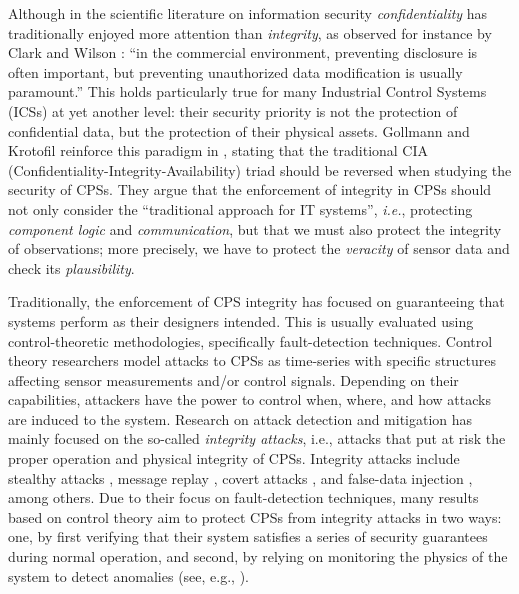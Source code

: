 {\color{red}
Although in the scientific literature on information security \emph{confidentiality} has traditionally enjoyed more attention than \emph{integrity}, as observed for instance by Clark and Wilson \cite{ClarkWilson87}: ``in the commercial environment, preventing disclosure is often important, but preventing unauthorized data modification is usually paramount.''
This holds particularly true for many Industrial Control Systems (ICSs) at yet another level: their security priority is not the protection of confidential data, but the protection of their physical assets.  Gollmann and Krotofil reinforce this paradigm in \cite{CPSSec}, stating that the traditional CIA (Confidentiality-Integrity-Availability) triad should be reversed when studying the security of CPSs. They argue that the enforcement of integrity in CPSs should not only consider the ``traditional approach for IT systems'', \emph{i.e.}, protecting \emph{component logic} and \emph{communication}, but that we must also protect the integrity of {observations}; more precisely, we have to protect the \emph{veracity} of sensor data and check its \emph{plausibility}.}

{Traditionally, the enforcement of CPS integrity has focused on guaranteeing that systems perform as their designers intended. This is usually evaluated using {control-theoretic methodologies}, specifically {fault-detection techniques}. Control theory researchers model attacks to CPSs as time-series with specific structures affecting sensor measurements and/or control signals. Depending on their capabilities, attackers have the power to control when, where, and how attacks are induced to the system. Research on attack detection and mitigation has mainly focused on the so-called \emph{integrity attacks}, i.e., attacks that put at risk the proper operation and physical integrity of CPSs. Integrity attacks include stealthy attacks \cite{CPSStealthAttacks}, message replay \cite{CPSReplayAttacks}, covert attacks \cite{CPSCovertAttacks}, and false-data injection \cite{CPSDataInjectionAttacks}, among others. Due to their focus on fault-detection techniques, many results based on control theory aim to protect CPSs from integrity attacks in two ways: one, by first verifying that their system satisfies a series of security guarantees during normal operation, and second, by relying on {monitoring} the physics of the system to detect anomalies (see, e.g., \cite{CPSInvariantsForDetection,LimitingImpactStealthyAttacks,CPSAttackDetection,CPSAttacksAgainstPCS,CPSIntegrityAttacks,CPSDetectingIntegrityAttacksScada}).
}

